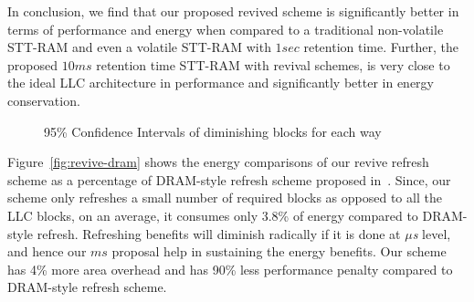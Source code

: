 In conclusion, we find that our proposed revived scheme is significantly better in terms of performance and energy
when compared to a traditional non-volatile STT-RAM and even a volatile STT-RAM with $1sec$ retention time.
Further, the proposed $10ms$ retention time STT-RAM with revival schemes, is very close to the ideal LLC architecture in performance and significantly better in energy conservation.



\begin{figure*} %
\begin{minipage}{0.580\textwidth}
\centering
 \caption{\label{fig:revive-dram} Figure showing the Energy impacts of Revive\newline refresh as a percentage of DRAM-style refresh}
\end{minipage}
\hfill %
\begin{minipage}{0.38\textwidth}
 \centering
 \caption{\label{fig:confi} 95\% Confidence Intervals of diminishing blocks for each way}
\end{minipage}
\end{figure*}



Figure~\ref{fig:revive-dram} shows the energy comparisons of our revive refresh scheme as a percentage of
DRAM-style refresh scheme proposed in~\cite{STTRAM:HPCA11}. Since, our scheme only refreshes a small
number of required blocks as opposed to all the LLC blocks, on an average, it consumes only 3.8\% of energy compared
to DRAM-style refresh. Refreshing benefits will diminish radically if it is done at {\it $\mu$s} level, and hence our $ms$ proposal help in sustaining the energy benefits. Our scheme has 4\% more area overhead and 
has 90\% less performance penalty compared to DRAM-style refresh scheme.


